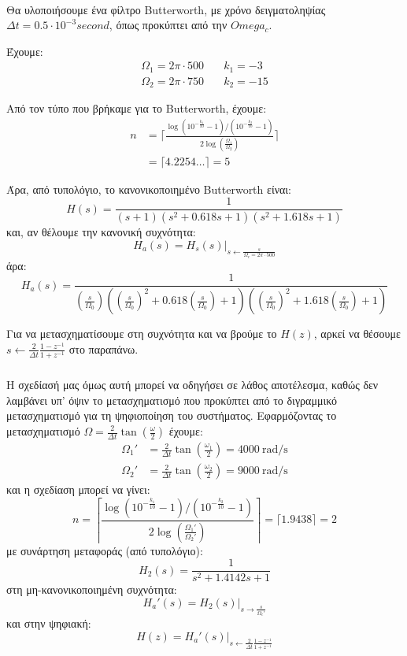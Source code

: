 \documentclass[11pt,a4paper,notitlepage,fleqn]{article}
\begin{document}
\paragraph{}
Θα υλοποιήσουμε ένα φίλτρο Butterworth, με χρόνο δειγματοληψίας \( Δt = 0.5 \cdot 10^{-3} \si{second} \),
όπως προκύπτει από την \( Omega_c \).

Έχουμε:
\begin{align*}
	\Omega_1 = 2π\cdot 500 &\quad k_1 = -3\\
	\Omega_2 = 2π\cdot 750 &\quad k_2 = -15
\end{align*}

Από τον τύπο που βρήκαμε για το Butterworth, έχουμε:
\begin{align*}
	n &= \lceil \frac{\log\left( 10^{-\frac{k_1}{10}} -1 \right)/\left(10^{-\frac{k_2}{10}}-1\right)}{2\log\left(\frac{\Omega_1}{\Omega_2}\right)} \rceil
	\\ &= \lceil 4.2254\dots \rceil = 5
\end{align*}

Άρα, από τυπολόγιο, το κανονικοποιημένο Butterworth είναι:
\[
H(s) = \frac{1}{(s+1)(s^2+0.618s+1)(s^2+1.618s+1)}
\]
και, αν θέλουμε την κανονική συχνότητα:
\[
\left. H_a(s) = H_s(s) \right|_{s\leftarrow\frac{s}{\Omega_c = 2\pi \cdot 500}}
\]
άρα:
\[
H_a(s) = \frac{1}{\left( \frac{s}{\Omega_0} \right) \left(
	\left(\frac{s}{\Omega_0}\right)^2
	+0.618\left(\frac{s}{\Omega_0}\right)+1
	\right)\left( \left(\frac{s}{\Omega_0}\right)^2 + 1.618\left(\frac{s}{\Omega_0}\right)+1 \right) }
\]

Για να μετασχηματίσουμε στη συχνότητα και να βρούμε το \( H(z) \), αρκεί να θέσουμε \( s \leftarrow \frac{2}{Δt}\frac{1-z^{-1}}{1+z^{-1}} \) στο παραπάνω.

\subparagraph{}
Η σχεδίασή μας όμως αυτή μπορεί να οδηγήσει σε λάθος αποτέλεσμα, καθώς δεν λαμβάνει υπ' όψιν το
μετασχηματισμό που προκύπτει από το διγραμμικό μετασχηματισμό για τη ψηφιοποίηση του
συστήματος. Εφαρμόζοντας το μετασχηματισμό \( \Omega = \frac{2}{Δt}\tan\left(\frac{\omega}{2}\right) \)
έχουμε:
\begin{align*}
	\Omega_1' &= \frac{2}{Δt} \tan\left(\frac{\omega_1}{2}\right) = \SI{4000}{\radian/\second} %
	\\ \Omega_2' &= \frac{2}{Δt} \tan\left(\frac{\omega_2}{2}\right) = \SI{9000}{\radian/\second} %
\end{align*}
και η σχεδίαση μπορεί να γίνει:
\[
n = \left\lceil \frac{\log\left( 10^{-\frac{k_1}{10}} -1 \right)/\left(10^{-\frac{k_2}{10}}-1\right)}{2\log\left(\frac{\Omega_1'}{\Omega_2'}\right)} \right\rceil
= \lceil 1.9438 \rceil = 2
\]
με συνάρτηση μεταφοράς (από τυπολόγιο):
\[
H_2(s) = \frac{1}{s^2+1.4142s+1}
\]
στη μη-κανονικοποιημένη συχνότητα:
\[
H_a'(s) = \left. H_2(s) \right|_{s\to\frac{s}{\Omega_c'}}
\]
και στην ψηφιακή:
\[
H(z) = \left. H_a'(s) \right|_{s\leftarrow \frac{2}{Δt} \frac{1-z^{-1}}{1+z^{-1}}}
\]
\end{document}
